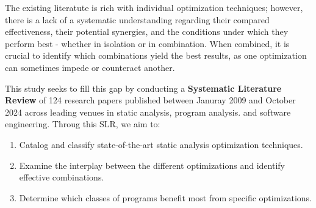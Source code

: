The existing literatute is rich with individual optimization techniques; however, there is a lack of a systematic understanding regarding their compared effectiveness, their potential synergies, and the conditions under which they perform best - whether in isolation or in combination.
When combined, it is crucial to identify which combinations yield the best results, as one optimization can sometimes impede or counteract another.

This study seeks to fill this gap by conducting a \textbf{Systematic Literature Review} of 124 research papers published between Januray 2009 and October 2024 across leading venues in static analysis, program analysis. and software engineering.
Throug this SLR, we aim to:

\begin{enumerate}
    \item Catalog and classify state-of-the-art static analysis optimization techniques.
    \item Examine the interplay between the different optimizations and identify effective combinations.
    \item Determine which classes of programs benefit most from specific optimizations.
\end{enumerate}